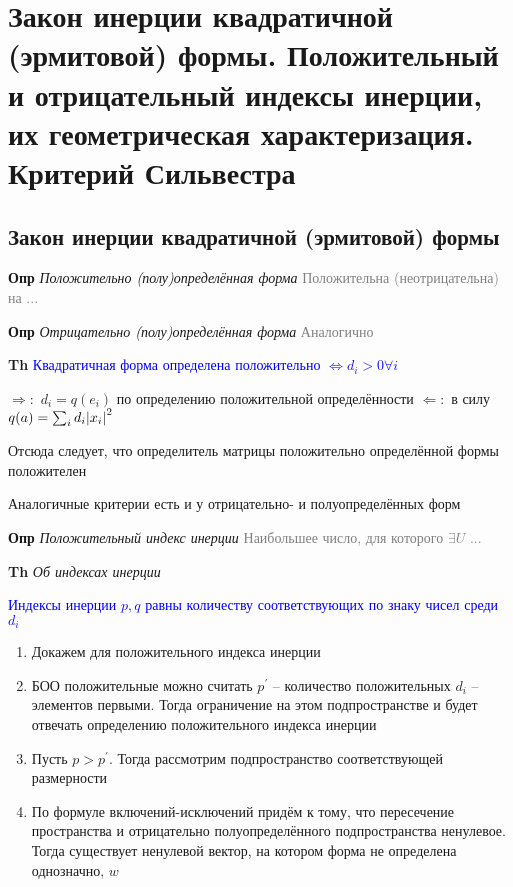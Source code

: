 \documentclass[a4paper, 14pt]{article}
\begin{document}
    \section{Закон инерции квадратичной (эрмитовой) формы.
    Положительный и отрицательный индексы инерции, их геометрическая характеризация.
    Критерий Сильвестра}

    \subsection{Закон инерции квадратичной (эрмитовой) формы}

    \textbf{Опр} \textit{Положительно (полу)определённая форма} \textcolor{gray}{Положительна (неотрицательна) на ...}

    \textbf{Опр} \textit{Отрицательно (полу)определённая форма} \textcolor{gray}{Аналогично}

    \textbf{Th} \textcolor{blue}{Квадратичная форма определена положительно $\Leftrightarrow d_i > 0 \forall i$}

    $\Rightarrow:$ $d_i = q(e_i)$ по определению положительной определённости
    $\Leftarrow:$ в силу $q(a) = \sum_i d_i \abs{x_i}^2$

    Отсюда следует, что определитель матрицы положительно определённой формы положителен

    Аналогичные критерии есть и у отрицательно- и полуопределённых форм

    \textbf{Опр} \textit{Положительный индекс инерции} \textcolor{gray}{Наибольшее число, для которого $\exists U$ ...}

    \textbf{Th} \textit{Об индексах инерции}

    \textcolor{blue}{Индексы инерции $p, q$ равны количеству соответствующих по знаку чисел среди $d_i$}

    \begin{enumerate}
        \item Докажем для положительного индекса инерции
        \item БОО положительные можно считать $p^{'}$ -- количество положительных $d_i$ -- элементов первыми.
        Тогда ограничение на этом подпространстве и будет отвечать определению положительного индекса инерции
        \item Пусть $p > p^{'}$.
        Тогда рассмотрим подпространство соответствующей размерности
        \item По формуле включений-исключений придём к тому, что пересечение пространства и отрицательно
        полуопределённого подпространства ненулевое.
        Тогда существует ненулевой вектор, на котором форма не определена однозначно, $w$
    \end{enumerate}
\end{document}
